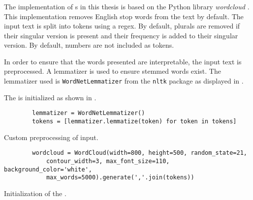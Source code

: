 \subsubsection*{\wordcloud{}}\label{subsubsec:impl-wordcloud}

The implementation of \wordcloud{}s in this thesis is based on the Python library \textit{wordcloud} \cite{wordcloud-dev}.
This implementation removes English stop words from the text by default.
The input text is split into tokens using a regex.
By default, plurals are removed if their singular version is present and their frequency is added to their singular version.
By default, numbers are not included as tokens.

In order to ensure that the words presented are interpretable, the input text is preprocessed.
A lemmatizer is used to ensure stemmed words exist.
The lemmatizer used is \texttt{WordNetLemmatizer} from the \texttt{nltk} package as displayed in .

The \wordcloud{} is initialized as shown in .

\begin{listing}[htp]
    \begin{verbatim}
        lemmatizer = WordNetLemmatizer()
        tokens = [lemmatizer.lemmatize(token) for token in tokens]
    \end{verbatim}
    \caption[Custom preprocessing of \wordcloud{} input]
    {Custom preprocessing of \wordcloud{} input.
    }
    \label{lst:impl-preproc-wordcloud}
\end{listing}

\begin{listing}[htp]
    \begin{verbatim}
        wordcloud = WordCloud(width=800, height=500, random_state=21, 
            contour_width=3, max_font_size=110, background_color='white', 
            max_words=5000).generate(','.join(tokens))
    \end{verbatim}
    \caption[Initialization of the \wordcloud{}]
    {Initialization of the \wordcloud{}.
    }
    \label{lst:impl-wordcloud}
\end{listing}

